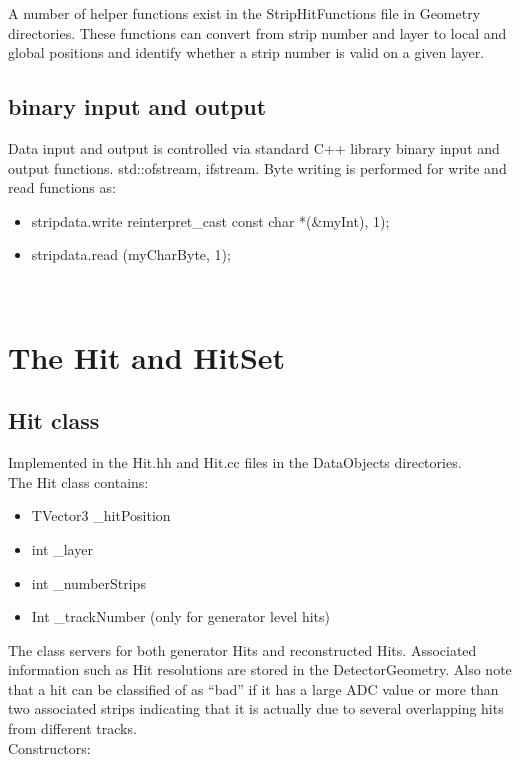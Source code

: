 \documentclass[aps,prd,superscriptaddress,floatfix]{revtex4}
\begin{document}
A number of helper functions exist in the StripHitFunctions file in Geometry directories.  These functions
can convert from strip number and layer to local and global positions and identify whether a strip number is valid
on a given layer.

\subsection{binary input and output}
Data input and output is controlled via standard C++ library binary input and
output functions. std::ofstream, ifstream.  Byte writing is performed for write and read functions as:

\begin{itemize}
\item stripdata.write reinterpret\_cast const char *(\&myInt), 1);
\item stripdata.read (myCharByte, 1);
\end{itemize}
\

\section{The Hit and HitSet}
\subsection{Hit class}
Implemented in the Hit.hh and Hit.cc files in the DataObjects directories.
\\

The Hit class contains:\\

\begin{itemize}
\item TVector3 \_hitPosition
\item int \_layer
\item int \_numberStrips
\item Int \_trackNumber (only for generator level hits)
\end{itemize}


The class servers for both generator Hits and reconstructed Hits.   Associated information such as Hit resolutions
are stored in the DetectorGeometry.  Also note that a hit can be classified of as ``bad'' if it has a large ADC
value or more than two associated strips indicating that it is actually due to several overlapping hits from
different tracks.
\\

Constructors:
\end{document}

